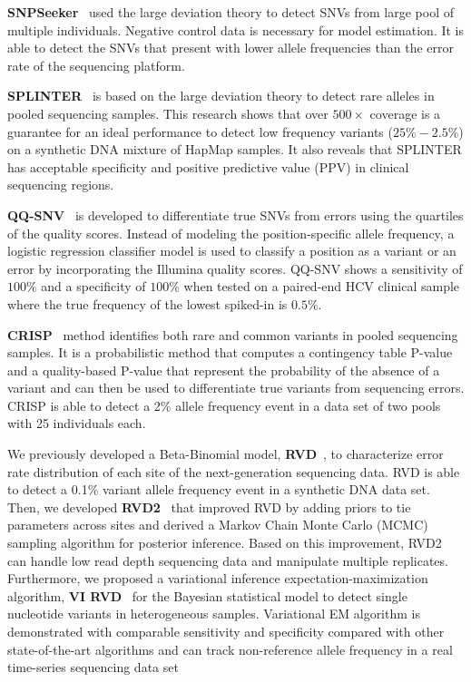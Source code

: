 \documentclass[a4,center,fleqn]{NAR}
\begin{document}
\textbf{SNPSeeker}~\citep{Druley2009} used the large deviation theory to detect SNVs from large pool of multiple individuals.
Negative control data is necessary for model estimation.
It is able to detect the SNVs that present with lower allele frequencies than the error rate of the sequencing platform.

\textbf{SPLINTER}~\citep{Spencer2014} is based on the large deviation theory to detect rare alleles in pooled sequencing samples.
This research shows that over $500 \times$ coverage is a guarantee for an ideal performance to detect low frequency variants ($25\% - 2.5\%$) on a synthetic DNA mixture of HapMap samples.
It also reveals that SPLINTER has acceptable specificity and positive predictive value (PPV) in clinical sequencing regions.

\textbf{QQ-SNV}~\citep{VanderBorght2015} is developed to differentiate true SNVs from errors using the quartiles of the quality scores.
Instead of modeling the position-specific allele frequency, a logistic regression classifier model is used to classify a position as a variant or an error by incorporating the Illumina quality scores.
QQ-SNV shows a sensitivity of $100\%$ and a specificity of $100\%$ when tested on a paired-end HCV clinical sample where the true frequency of the lowest spiked-in is $0.5\%$.


\textbf{CRISP}~\citep{Bansal2010} method identifies both rare and common variants in pooled sequencing samples.
It is a probabilistic method that computes a contingency table P-value and a quality-based P-value that represent the probability of the absence of a variant and can then be used to differentiate true variants from sequencing errors.
CRISP is able to detect a 2\% allele frequency event in a data set of two pools with 25 individuals each.


We previously developed a Beta-Binomial model, \textbf{RVD}~\citep{Flaherty2012}, to characterize error rate distribution of each site of the next-generation sequencing data.
RVD is able to detect a 0.1\% variant allele frequency event in a synthetic DNA data set.
Then, we developed \textbf{RVD2}~\citep{He2015} that improved RVD by adding priors to tie parameters across sites and derived a Markov Chain Monte Carlo (MCMC) sampling algorithm for posterior inference.
Based on this improvement, RVD2 can handle low read depth sequencing data and manipulate multiple replicates.
Furthermore, we proposed a variational inference expectation-maximization algorithm, \textbf{VI RVD}~\citep{zhang2016variational} for the Bayesian statistical model to detect single nucleotide variants in heterogeneous samples.
Variational EM algorithm is demonstrated with comparable sensitivity and specificity compared with other state-of-the-art algorithms and can track non-reference allele frequency in a real time-series sequencing data set
\end{document}
